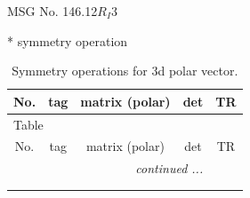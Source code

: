 \documentclass[fleqn,8pt]{jsarticle}
\begin{document}
\setcounter{MaxMatrixCols}{32}

\renewcommand{\tablename}{Table~}
\renewcommand{\figurename}{Figure~}
\begin{center}
\LARGE
MSG No. 146.12\quad$R_{I}3$
\end{center}
* symmetry operation
\renewcommand{\arraystretch}{1.3}
\begin{longtable}{ccccc}
\caption{Symmetry operations for 3d polar vector.}
 \\
 \hline \hline
No. & tag & matrix (polar) & det & TR \\ \hline \endfirsthead

\multicolumn{4}{l}{\tablename\ \thetable{}} \\
 \hline \hline
No. & tag & matrix (polar) & det & TR \\ \hline \endhead

 \hline \hline
\multicolumn{4}{r}{\footnotesize\it continued ...} \\ \endfoot

 \hline \hline
\multicolumn{4}{r}{} \\ \endlastfoot


\end{longtable}
\end{document}
